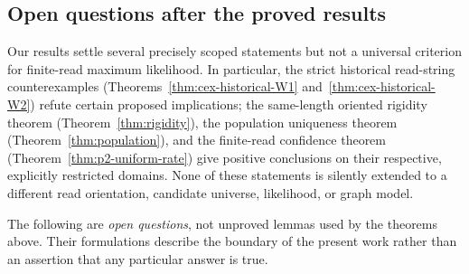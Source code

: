 \subsection{Open questions after the proved results}
\label{sec:open-questions-final}

Our results settle several precisely scoped statements but not a universal
criterion for finite-read maximum likelihood.  In particular, the strict
historical read-string counterexamples
(Theorems~\ref{thm:cex-historical-W1} and~\ref{thm:cex-historical-W2})
refute certain proposed implications; the same-length oriented rigidity
theorem (Theorem~\ref{thm:rigidity}), the population uniqueness theorem
(Theorem~\ref{thm:population}), and the finite-read confidence theorem
(Theorem~\ref{thm:p2-uniform-rate}) give positive conclusions on their
respective, explicitly restricted domains.  None of these statements is
silently extended to a different read orientation, candidate universe,
likelihood, or graph model.

The following are \emph{open questions}, not unproved lemmas used by
the theorems above.  Their formulations describe the boundary of the
present work rather than an assertion that any particular answer is true.

